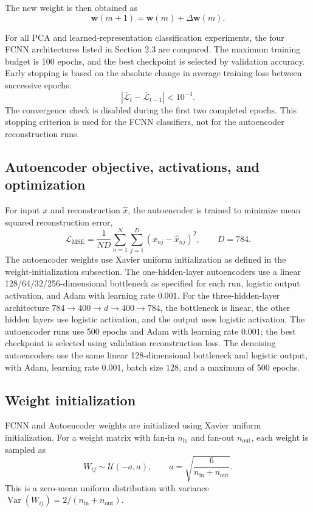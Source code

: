 \documentclass[conference,onecolumn]{IEEEtran}
\begin{document}
The new weight is then obtained as 
\begin{equation} 
\mathbf{w}(m+1)=\mathbf{w}(m)+\Delta \mathbf{w}(m). \label{eq:momentum_weight} 
\end{equation}

For all PCA and learned-representation classification experiments, the four FCNN
architectures listed in Section 2.3 are compared. The maximum training budget is 100
epochs, and the best checkpoint is selected by validation accuracy. Early stopping is
based on the absolute change in average training loss between successive epochs:
\begin{equation}
|\bar{\mathcal{L}}_t-\bar{\mathcal{L}}_{t-1}|<10^{-4}.
\end{equation}
The convergence check is disabled during the first two completed epochs. This stopping
criterion is used for the FCNN classifiers, not for the autoencoder reconstruction runs.

\subsection{Autoencoder objective, activations, and optimization}
For input $x$ and reconstruction $\hat{x}$, the autoencoder is trained to minimize mean
squared reconstruction error,
\begin{equation}
\mathcal{L}_{\mathrm{MSE}}=\frac{1}{ND}\sum_{n=1}^{N}
\sum_{j=1}^{D}(x_{nj}-\hat{x}_{nj})^2,\qquad D=784.
\end{equation}
The autoencoder weights use Xavier uniform initialization as defined in the weight-initialization subsection. The one-hidden-layer autoencoders use a linear 128/64/32/256-dimensional bottleneck as
specified for each run, logistic output activation, and Adam with learning rate $0.001$.
For the three-hidden-layer architecture $784\rightarrow400\rightarrow d\rightarrow400
\rightarrow784$, the bottleneck is linear, the other hidden layers use logistic
activation, and the output uses logistic activation. The autoencoder runs use 500 epochs
and Adam with learning rate $0.001$; the best checkpoint is selected using validation
reconstruction loss. The denoising autoencoders use the same linear 128-dimensional
bottleneck and logistic output, with Adam, learning rate $0.001$, batch size $128$, and
a maximum of 500 epochs.


\subsection{Weight initialization}
FCNN and Autoencoder weights are initialized using Xavier uniform initialization. For a weight matrix
with fan-in $n_{\mathrm{in}}$ and fan-out $n_{\mathrm{out}}$, each weight is sampled as
\begin{equation}
W_{ij}\sim\mathcal{U}(-a,a),\qquad
a=\sqrt{\frac{6}{n_{\mathrm{in}}+n_{\mathrm{out}}}}.
\end{equation}
This is a zero-mean uniform distribution with variance
$\operatorname{Var}(W_{ij})=2/(n_{\mathrm{in}}+n_{\mathrm{out}})$.
\end{document}
